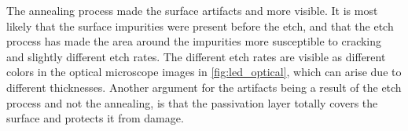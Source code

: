 The annealing process made the surface artifacts and more visible.
It is most likely that the surface impurities were present before the etch, and that the etch process has made the area around the impurities more susceptible to cracking and slightly different etch rates.
The different etch rates are visible as different colors in the optical microscope images in \autoref{fig:led_optical}, which can arise due to different thicknesses. 
Another argument for the artifacts being a result of the etch process and not the annealing, is that the passivation layer totally covers the surface and protects it from damage. 




